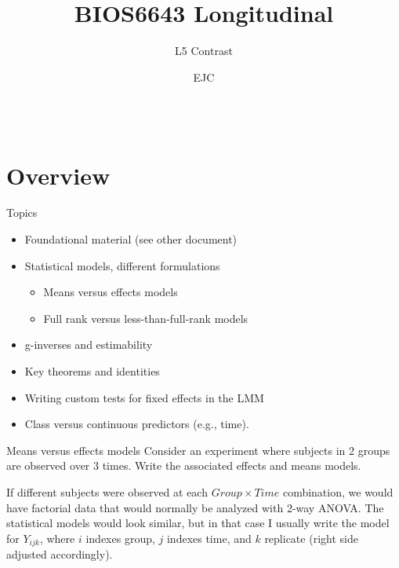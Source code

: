 \documentclass[
  9pt,
  ignorenonframetext,
]{beamer}
\title{BIOS6643 Longitudinal}
\subtitle{L5 Contrast}
\author{EJC}
\date{}
\institute{Department of Biostatistics \& Informatics}
\providecommand{\tightlist}{%
  \setlength{\itemsep}{0pt}\setlength{\parskip}{0pt}}
\begin{document}
\frame{\titlepage}

\begin{frame}
  \begin{columns}
  \column{10cm}
  \tableofcontents
  \end{columns}
\end{frame}
\hypertarget{overview}{%
\section{Overview}\label{overview}}

\begin{frame}{Topics}
\protect\hypertarget{topics}{}
\begin{itemize}
\item
  Foundational material (see other document)
\item
  Statistical models, different formulations

  \begin{itemize}
  \tightlist
  \item
    Means versus effects models
  \item
    Full rank versus less-than-full-rank models
  \end{itemize}
\item
  g-inverses and estimability
\item
  Key theorems and identities
\item
  Writing custom tests for fixed effects in the LMM
\item
  Class versus continuous predictors (e.g., time).
\end{itemize}
\end{frame}

\begin{frame}{Means versus effects models}
\protect\hypertarget{means-versus-effects-models}{}
Consider an experiment where subjects in 2 groups are observed over 3
times. Write the associated effects and means models.

\vspace{\baselineskip}
\vspace{\baselineskip}

If different subjects were observed at each \(Group \times Time\)
combination, we would have factorial data that would normally be
analyzed with 2-way ANOVA. The statistical models would look similar,
but in that case I usually write the model for \(Y_{ijk}\), where \(i\)
indexes group, \(j\) indexes time, and \(k\) replicate (right side
adjusted accordingly).
\end{frame}
\end{document}
